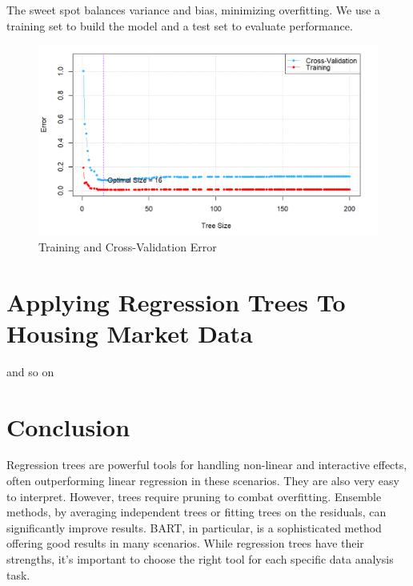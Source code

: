 \documentclass[12pt]{article}
\begin{document}
The sweet spot balances variance and bias, minimizing overfitting. We use a training set to build the model and a test set to evaluate performance.


\begin{figure}
    \centering
    \includegraphics[scale=0.50]{Pruning.png}
    \caption{Training and Cross-Validation Error}
    \label{fig:sub4}  %
\end{figure}




\section{Applying Regression Trees To Housing Market Data}


and so on






 \section{Conclusion}
Regression trees are powerful tools for handling non-linear and interactive effects, often outperforming linear regression in these scenarios. They are also very easy to interpret. However, trees require pruning to combat overfitting. Ensemble methods, by averaging independent trees or fitting trees on the residuals, can significantly improve results. BART, in particular, is a sophisticated method offering good results in many scenarios. While regression trees have their strengths, it's important to choose the right tool for each specific data analysis task.
\end{document}
